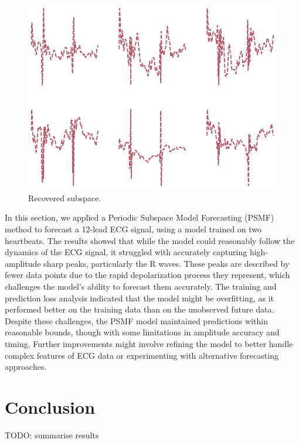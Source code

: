 \documentclass{mldsmsc}
\begin{document}
\begin{figure}[h]
\begin{center}
\includegraphics[scale=1]{images/forecast/periodic_bases.pdf}
\caption{Recovered subspace.}
\label{bases}
\end{center}
\end{figure}

\noindent In this section, we applied a Periodic Subspace Model Forecasting (PSMF) method to forecast a 12-lead ECG signal, using a model trained on two heartbeats. The results showed that while the model could reasonably follow the dynamics of the ECG signal, it struggled with accurately capturing high-amplitude sharp peaks, particularly the R waves. These peaks are described by fewer data points due to the rapid depolarization process they represent, which challenges the model's ability to forecast them accurately. The training and prediction loss analysis indicated that the model might be overfitting, as it performed better on the training data than on the unobserved future data. Despite these challenges, the PSMF model maintained predictions within reasonable bounds, though with some limitations in amplitude accuracy and timing. Further improvements might involve refining the model to better handle complex features of ECG data or experimenting with alternative forecasting approaches.

\chapter{Conclusion}

TODO: summarise results
\end{document}
